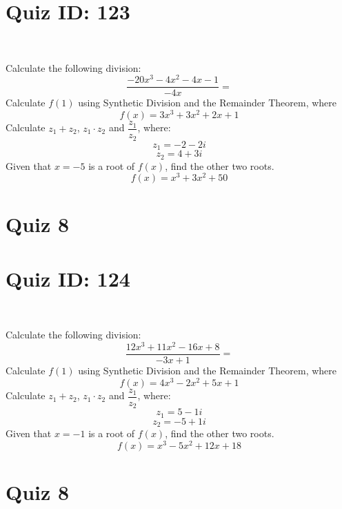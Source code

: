 \documentclass{exam}
\begin{document}
\section*{Quiz ID: 123}
\vspace{0.5cm}\
\vspace{1cm}\
\begin{questions}
\question Calculate the following division:\[\dfrac{
-20x^3 - 4x^2 - 4x - 1}{
-4x}=\] \makeemptybox{\stretch{2}}
\question Calculate $f(1)$ using Synthetic Division and the Remainder Theorem, where\[f(x) = 
3x^3 + 3x^2 + 2x + 1\]
\newpage\question Calculate $z_1+z_2$, $z_1\cdot z_2$ and $\dfrac{z_1}{z_2}$, where:\[z_1=-2-2\mathit{i}\]\[z_2=4+3\mathit{i}\]
\question Given that $x=-5$ is a root of $f(x)$, find the other two roots.\[f(x)=
x^3 + 3x^2 + 50\]\makeemptybox{\stretch{1}}
\end{questions}\newpage
\newpage
\section*{Quiz 8}
\section*{Quiz ID: 124}
\vspace{0.5cm}\
\vspace{1cm}\
\begin{questions}
\question Calculate the following division:\[\dfrac{
12x^3 + 11x^2 - 16x + 8}{
-3x + 1}=\] 
\question Calculate $f(1)$ using Synthetic Division and the Remainder Theorem, where\[f(x) = 
4x^3 - 2x^2 + 5x + 1\]
\newpage\question Calculate $z_1+z_2$, $z_1\cdot z_2$ and $\dfrac{z_1}{z_2}$, where:\[z_1=5-1\mathit{i}\]\[z_2=-5+1\mathit{i}\]\makeemptybox{\stretch{1}}
\question Given that $x=-1$ is a root of $f(x)$, find the other two roots.\[f(x)=
x^3 - 5x^2 + 12x + 18\]\makeemptybox{\stretch{1}}
\end{questions}\newpage
\newpage
\section*{Quiz 8}
\end{document}
